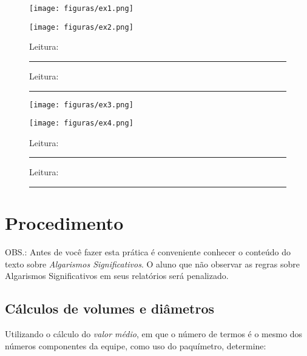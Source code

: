 \documentclass[10pt,a4paper,onecolumn,notitlepage]{scrartcl}
\begin{document}
\begin{figure}[H]
\label{fig:prelab}
\centering
\begin{minipage}{\linewidth}
\begin{minipage}{0.5\linewidth}
\texttt{[image: figuras/ex1.png]} 
\end{minipage}
\begin{minipage}{0.5\linewidth}
\texttt{[image: figuras/ex2.png]} 
\end{minipage}
\begin{minipage}{0.4\linewidth}
\vspace{0.5cm}
Leitura:\rule{3cm}{0.4pt}
\vspace{1cm}
\end{minipage}
\begin{minipage}{0.4\linewidth}
\vspace{0.5cm}
Leitura:\rule{3cm}{0.4pt}
\vspace{1cm}
\end{minipage}
\begin{minipage}{0.5\linewidth}
\texttt{[image: figuras/ex3.png]} 
\end{minipage}
\begin{minipage}{0.5\linewidth}
\texttt{[image: figuras/ex4.png]} 
\end{minipage}
\begin{minipage}{0.5\linewidth}
\vspace{0.5cm}
Leitura:\rule{3cm}{0.4pt}
\vspace{1cm}
\end{minipage}
\begin{minipage}{0.5\linewidth}
\vspace{0.5cm}
Leitura:\rule{3cm}{0.4pt}
\vspace{1cm}
\end{minipage}
\end{minipage}
\end{figure}


\section{Procedimento}
OBS.: Antes de você fazer esta prática é conveniente conhecer o conteúdo do texto sobre \emph{Algarismos Significativos}. O aluno que não observar as regras sobre Algarismos Significativos em seus relatórios será penalizado.


\subsection{Cálculos de volumes e diâmetros}
Utilizando o cálculo do \emph{valor médio}, em que o número de termos  é o mesmo dos números componentes da equipe, como uso do paquímetro, determine:
\end{document}
